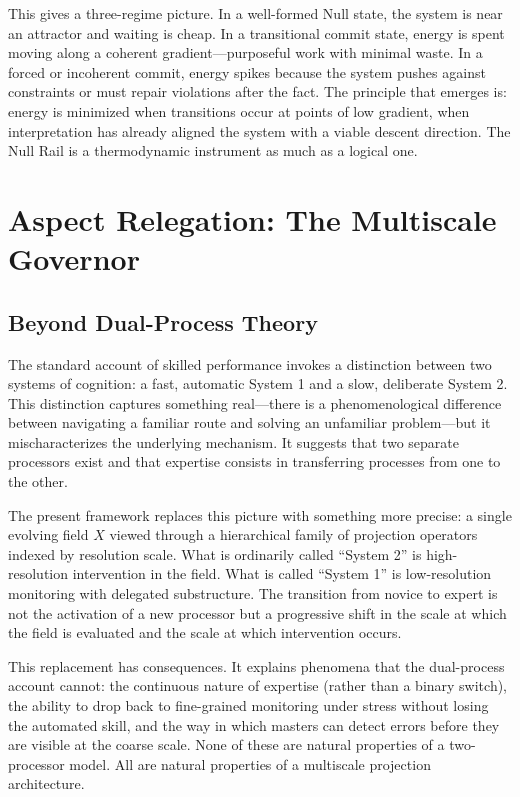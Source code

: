\documentclass[11pt,oneside]{book}
\begin{document}
This gives a three-regime picture. In a well-formed Null state, the system is near an attractor and waiting is cheap. In a transitional commit state, energy is spent moving along a coherent gradient---purposeful work with minimal waste. In a forced or incoherent commit, energy spikes because the system pushes against constraints or must repair violations after the fact. The principle that emerges is: energy is minimized when transitions occur at points of low gradient, when interpretation has already aligned the system with a viable descent direction. The Null Rail is a thermodynamic instrument as much as a logical one.

\chapter{Aspect Relegation: The Multiscale Governor}

\section{Beyond Dual-Process Theory}

The standard account of skilled performance invokes a distinction between two systems of cognition: a fast, automatic System 1 and a slow, deliberate System 2. This distinction captures something real---there is a phenomenological difference between navigating a familiar route and solving an unfamiliar problem---but it mischaracterizes the underlying mechanism. It suggests that two separate processors exist and that expertise consists in transferring processes from one to the other.

The present framework replaces this picture with something more precise: a single evolving field $X$ viewed through a hierarchical family of projection operators indexed by resolution scale. What is ordinarily called ``System 2'' is high-resolution intervention in the field. What is called ``System 1'' is low-resolution monitoring with delegated substructure. The transition from novice to expert is not the activation of a new processor but a progressive shift in the scale at which the field is evaluated and the scale at which intervention occurs.

This replacement has consequences. It explains phenomena that the dual-process account cannot: the continuous nature of expertise (rather than a binary switch), the ability to drop back to fine-grained monitoring under stress without losing the automated skill, and the way in which masters can detect errors before they are visible at the coarse scale. None of these are natural properties of a two-processor model. All are natural properties of a multiscale projection architecture.
\end{document}
